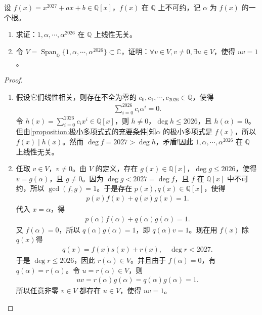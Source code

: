 \documentclass[../../main.tex]{subfiles}%
\begin{document}
\begin{example}
设 $f(x)=x^{2027}+ax+b\in\mathbb{Q}[x]$，$f(x)$ 在 $\mathbb{Q}$ 上不可约，记 $\alpha$ 为 $f(x)$ 的一个根。
\begin{enumerate}[(1)]
\item 求证：$1,\alpha,\cdots,\alpha^{2026}$ 在 $\mathbb{Q}$ 上线性无关。
\item 令 $V=\operatorname{Span}_{\mathbb{Q}}\{1,\alpha,\cdots,\alpha^{2026}\}\subset\mathbb{C}$，证明：$\forall v\in V, v\neq 0, \exists u\in V$，使得 $uv=1$。
\end{enumerate}
\end{example}
\begin{proof}
\begin{enumerate}[(1)]
\item 假设它们线性相关，则存在不全为零的 $c_0,c_1,\cdots,c_{2026}\in\mathbb{Q}$，使得
\begin{align*}
\sum_{i=0}^{2026} c_i\alpha^i=0.
\end{align*}
令 $h(x)=\sum_{i=0}^{2026} c_i x^i\in\mathbb{Q}[x]$，则 $h\neq 0$，$\deg h\leqslant 2026$，且 $h(\alpha)=0$。但由\cref{proposition:极小多项式式的充要条件}知$\alpha$ 的极小多项式是 $f(x)$，所以 $f(x)\mid h(x)$。然而 $\deg f=2027>\deg h$，矛盾!因此 $1,\alpha,\cdots,\alpha^{2026}$ 在 $\mathbb{Q}$ 上线性无关。

\item 任取 $v\in V$，$v\neq 0$。由 $V$ 的定义，存在 $g(x)\in\mathbb{Q}[x]$，$\deg g\leqslant 2026$，使得 $v=g(\alpha)$，且 $g\neq 0$。因为 $\deg g<2027=\deg f$，且 $f$ 在 $\mathbb{Q}[x]$ 中不可约，所以 $\gcd(f,g)=1$。于是存在 $p(x),q(x)\in\mathbb{Q}[x]$，使得
\begin{align*}
p(x)f(x)+q(x)g(x)=1.
\end{align*}
代入 $x=\alpha$，得
\begin{align*}
p(\alpha)f(\alpha)+q(\alpha)g(\alpha)=1.
\end{align*}
又 $f(\alpha)=0$，所以 $q(\alpha)g(\alpha)=1$，即 $q(\alpha)v=1$。现在用 $f(x)$ 除 $q(x)$得
\begin{align*}
q(x)=f(x)s(x)+r(x),\quad \deg r<2027.
\end{align*}
于是 $\deg r\leqslant 2026$，因此 $r(\alpha)\in V$。并且由于 $f(\alpha)=0$，有 $q(\alpha)=r(\alpha)$。令 $u=r(\alpha)\in V$，则
\begin{align*}
uv=r(\alpha)g(\alpha)=q(\alpha)g(\alpha)=1.
\end{align*}
所以任意非零 $v\in V$ 都存在 $u\in V$，使得 $uv=1$。
\end{enumerate}
\end{proof}
\end{document}
